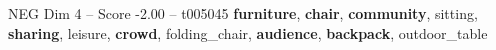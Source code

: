 \begin{textsample}{NEG Dim 4 – Score -2.00 – t005045}  \label{ex:f4_neg_027}
\textbf{furniture}, \textbf{chair}, \textbf{community}, sitting, \textbf{sharing}, leisure, \textbf{crowd}, folding\_chair, \textbf{audience}, \textbf{backpack}, outdoor\_table

\end{textsample}
